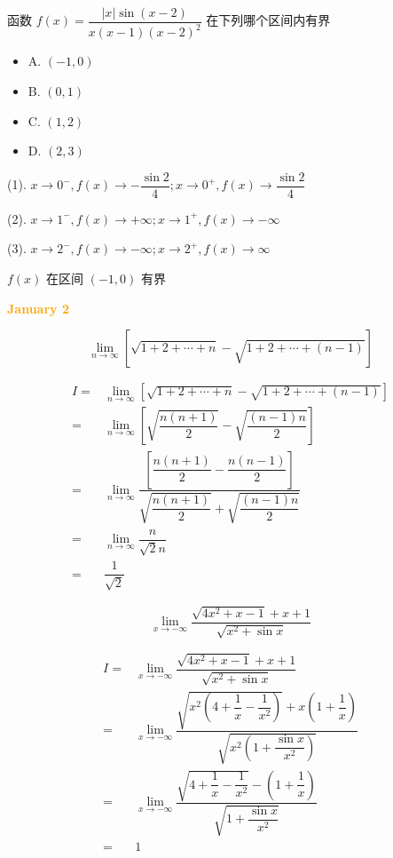 \begin{example}[][Exam: 27.1.7]
	函数 $f(x)=\dfrac{|x|\sin(x-2)}{x(x-1)(x-2)^{2}}$ 在下列哪个区间内有界
\begin{itemize}
	\item A. $(-1,0)$
	\item B. $(0,1)$
	\item C. $(1,2)$
	\item D. $(2,3)$
\end{itemize}
\end{example}

\begin{solution}

	(1). $x\to 0^{-}, f(x)\to -\dfrac{\sin 2}{4}; x\to 0^{+}, f(x)\to \dfrac{\sin 2}{4}$

	(2). $x\to 1^{-}, f(x)\to +\infty; x\to 1^{+}, f(x)\to -\infty$

	(3). $x\to 2^{-}, f(x)\to -\infty; x\to 2^{+}, f(x)\to \infty$

	$f(x)$ 在区间 $(-1,0)$ 有界
\end{solution}

\textcolor{orange}{\textbf{January 2}}

\begin{example}[][Exam: 27.1.8]
	$$\lim\limits_{n\to\infty}\left[\sqrt{1+2+\cdots+n}-\sqrt{1+2+\cdots+(n-1)}\right]$$
\end{example}

\begin{solution}

	\begin{align*}
		I = & \lim\limits_{n\to\infty}\left[\sqrt{1+2+\cdots+n}-\sqrt{1+2+\cdots+(n-1)}\right]\\
		  = & \lim\limits_{n\to\infty}\left[\sqrt{\dfrac{n(n+1)}{2}}-\sqrt{\dfrac{(n-1)n}{2}}\right]\\
		  = & \lim\limits_{n\to\infty}\dfrac{\left[\dfrac{n(n+1)}{2}-\dfrac{n(n-1)}{2}\right]}{\sqrt{\dfrac{n(n+1)}{2}}+\sqrt{\dfrac{(n-1)n}{2}}}\\
		  = & \lim\limits_{n\to\infty}\dfrac{n}{\sqrt{2}n}\\
		  = & \dfrac{1}{\sqrt{2}} 
	\end{align*}
\end{solution}
\begin{example}[][Exam: 27.1.9]
	$$\lim\limits_{x\to-\infty}\dfrac{\sqrt{4x^{2}+x-1}+x+1}{\sqrt{x^{2}+\sin x}}$$
\end{example}

\begin{solution}

	\begin{align*}
		I = & \lim\limits_{x\to-\infty}\dfrac{\sqrt{4x^{2}+x-1}+x+1}{\sqrt{x^{2}+\sin x}}\\
		  = & \lim\limits_{x\to-\infty}\dfrac{\sqrt{x^{2}(4+\dfrac{1}{x}-\dfrac{1}{x^{2}})}+x(1+\dfrac{1}{x})}{\sqrt{x^{2}(1+\dfrac{\sin x}{x^{2}})}}\\
		  = & \lim\limits_{x\to-\infty}\dfrac{\sqrt{4+\dfrac{1}{x}-\dfrac{1}{x^{2}}}-(1+\dfrac{1}{x})}{\sqrt{1+\dfrac{\sin x}{x^{2}}}}\\
		  = & 1
	\end{align*}
\end{solution}

